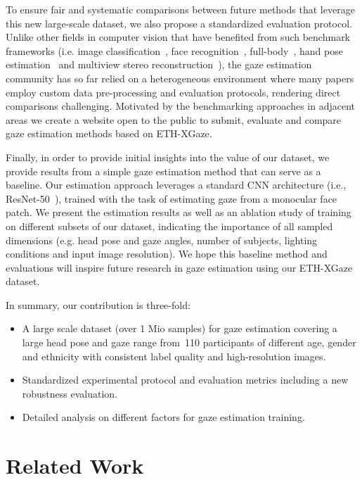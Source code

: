\documentclass[runningheads]{llncs}
\newcommand{\datasetname}{ETH-XGaze\xspace}
\newcommand{\numparticipant}{110\xspace}
\begin{document}
To ensure fair and systematic comparisons between future methods that leverage this new large-scale dataset, we also propose a standardized evaluation protocol. Unlike other fields in computer vision that have benefited from such benchmark frameworks (i.e. image classification~\cite{russakovsky2015imagenet}, face recognition~\cite{nech2017level}, full-body~\cite{h36m}, hand pose estimation~\cite{zimmermann2019freihand} and multiview stereo reconstruction~\cite{seitz2006comparison}), the gaze estimation community has so far relied on a heterogeneous environment where many papers employ custom data pre-processing and evaluation protocols, rendering direct comparisons challenging.
Motivated by the benchmarking approaches in adjacent areas we create a website open to the public to submit, evaluate and compare gaze estimation methods based on \datasetname. 

Finally, in order to provide initial insights into the value of our dataset, we provide results from a simple gaze estimation method that can serve as a baseline. Our estimation approach leverages a standard CNN architecture (i.e., ResNet-50~\cite{he2016deep}), trained with the task of estimating gaze from a monocular face patch. We present the estimation results as well as an ablation study of training on different subsets of our dataset, indicating the importance of all sampled dimensions (e.g. head pose and gaze angles, number of subjects, lighting conditions and input image resolution). We hope this baseline method and evaluations will inspire future research in gaze estimation using our \datasetname dataset.  

\noindent In summary, our contribution is three-fold:
\begin{itemize}
\item A large scale dataset (over 1 Mio samples) for gaze estimation covering a large head pose and gaze range from~\numparticipant participants of different age, gender and ethnicity with consistent label quality and high-resolution images.
\item Standardized experimental protocol and evaluation metrics including a new robustness evaluation.
\item Detailed analysis on different factors for gaze estimation training.
\end{itemize}

 
\section{Related Work}
\end{document}
